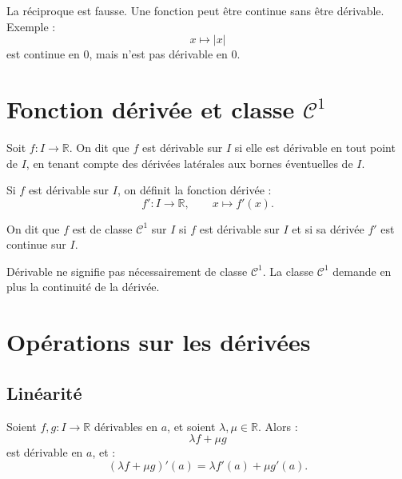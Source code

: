 \documentclass[11pt,a4paper]{article}
\newcommand{\R}{\mathbb R}
\begin{document}
\begin{erreurbox}
La réciproque est fausse.  
Une fonction peut être continue sans être dérivable.  
Exemple :
\[
x\mapsto |x|
\]
est continue en \(0\), mais n'est pas dérivable en \(0\).
\end{erreurbox}

\section{Fonction dérivée et classe \(\mathcal C^1\)}

\begin{definitionbox}
Soit \(f:I\to\R\).  
On dit que \(f\) est dérivable sur \(I\) si elle est dérivable en tout point de \(I\), en tenant compte des dérivées latérales aux bornes éventuelles de \(I\).
\end{definitionbox}

\begin{definitionbox}
Si \(f\) est dérivable sur \(I\), on définit la fonction dérivée :
\[
f':I\to\R,
\qquad
x\mapsto f'(x).
\]
\end{definitionbox}

\begin{definitionbox}
On dit que \(f\) est de classe \(\mathcal C^1\) sur \(I\) si \(f\) est dérivable sur \(I\) et si sa dérivée \(f'\) est continue sur \(I\).
\end{definitionbox}

\begin{retenirbox}
Dérivable ne signifie pas nécessairement de classe \(\mathcal C^1\).  
La classe \(\mathcal C^1\) demande en plus la continuité de la dérivée.
\end{retenirbox}

\section{Opérations sur les dérivées}

\subsection{Linéarité}

\begin{theorembox}
Soient \(f,g:I\to\R\) dérivables en \(a\), et soient \(\lambda,\mu\in\R\).  
Alors :
\[
\lambda f+\mu g
\]
est dérivable en \(a\), et :
\[
(\lambda f+\mu g)'(a)=\lambda f'(a)+\mu g'(a).
\]
\end{theorembox}
\end{document}

